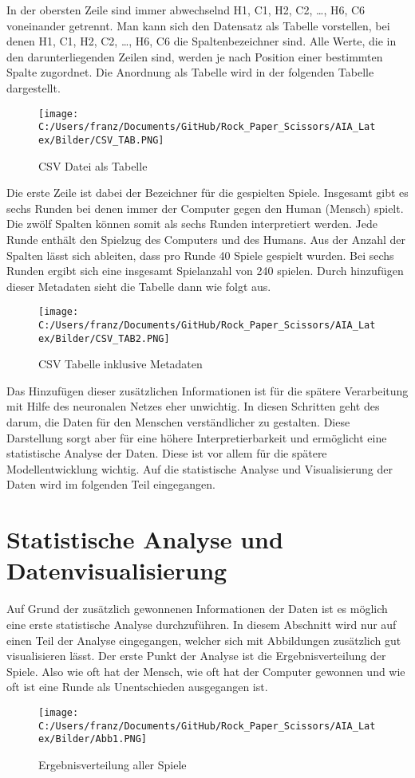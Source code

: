 \documentclass[thesis=paper,fancy]{hsmw-thesis}
\begin{document}
In der obersten Zeile sind immer abwechselnd H1, C1, H2, C2, …, H6, C6 voneinander getrennt. Man kann sich den Datensatz als Tabelle vorstellen, bei denen H1, C1, H2, C2, …, H6, C6 die Spaltenbezeichner sind. Alle Werte, die in den darunterliegenden Zeilen sind, werden je nach Position einer bestimmten Spalte zugordnet. Die Anordnung als Tabelle wird in der folgenden Tabelle dargestellt.

\begin{figure}[h]
 		\texttt{[image: C:/Users/franz/Documents/GitHub/Rock\_Paper\_Scissors/AIA\_Latex/Bilder/CSV\_TAB.PNG]}
 		\centering
 		\caption{CSV Datei als Tabelle}
 	\label{fig:CSV Datei als Tabelle}
\end{figure}
Die erste Zeile ist dabei der Bezeichner für die gespielten Spiele. Insgesamt gibt es sechs Runden bei denen immer der Computer gegen den Human (Mensch) spielt. Die zwölf Spalten können somit als sechs Runden interpretiert werden. Jede Runde enthält den Spielzug des Computers und des Humans. Aus der Anzahl der Spalten lässt sich ableiten, dass pro Runde 40 Spiele gespielt wurden. Bei sechs Runden ergibt sich eine insgesamt Spielanzahl von 240 spielen. Durch hinzufügen dieser Metadaten sieht die Tabelle dann wie folgt aus.
\begin{figure}[h]
 		\texttt{[image: C:/Users/franz/Documents/GitHub/Rock\_Paper\_Scissors/AIA\_Latex/Bilder/CSV\_TAB2.PNG]}
 		\centering
 		\caption{CSV Tabelle inklusive Metadaten}
 	\label{fig:CSV Tabelle inklusive Metadaten}
\end{figure}
Das Hinzufügen dieser zusätzlichen Informationen ist für die spätere Verarbeitung mit Hilfe des neuronalen Netzes eher unwichtig. In diesen Schritten geht des darum, die Daten für den Menschen verständlicher zu gestalten. Diese Darstellung sorgt aber für eine höhere Interpretierbarkeit und ermöglicht eine statistische Analyse der Daten. Diese ist vor allem für die spätere Modellentwicklung wichtig. Auf die statistische Analyse und Visualisierung der Daten wird im folgenden Teil eingegangen.
\section{Statistische Analyse und Datenvisualisierung}
Auf Grund der zusätzlich gewonnenen Informationen der Daten ist es möglich eine erste statistische Analyse durchzuführen. In diesem Abschnitt wird nur auf einen Teil der Analyse eingegangen, welcher sich mit Abbildungen zusätzlich gut visualisieren lässt. 
Der erste Punkt der Analyse ist die Ergebnisverteilung der Spiele. Also wie oft hat der Mensch, wie oft hat der Computer gewonnen und wie oft ist eine Runde als Unentschieden ausgegangen ist.
\begin{figure}[h]
 		\texttt{[image: C:/Users/franz/Documents/GitHub/Rock\_Paper\_Scissors/AIA\_Latex/Bilder/Abb1.PNG]}
 		\centering
 		\caption{Ergebnisverteilung aller Spiele}
 	\label{fig:Ergebnisverteilung aller Spiele}
\end{figure}
\end{document}
